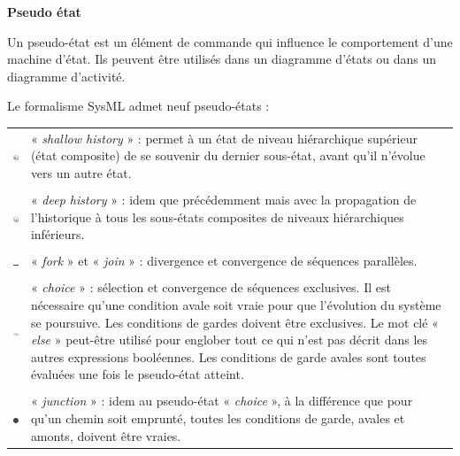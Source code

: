 \documentclass[10pt]{article}
\begin{document}
\begin{defi}
\textbf{Pseudo état}

Un pseudo-état est un élément de commande qui influence le comportement d’une machine d’état. Ils peuvent être utilisés dans un diagramme d’états ou dans un diagramme d’activité.

Le formalisme SysML admet neuf pseudo-états :

\begin{tabular}[c]{c p{15cm}}
\includegraphics[width=.5cm]{images/sh}
&
« \textit{shallow history} » : permet à un état de niveau hiérarchique supérieur (état
composite) de se souvenir du dernier sous-état, avant qu’il n’évolue vers un autre état. \\
& \\
\includegraphics[width=.5cm]{images/dh}
&
« \textit{deep history} » : idem que précédemment mais avec la propagation de l’historique à
tous les sous-états composites de niveaux hiérarchiques inférieurs. \\
& \\
\includegraphics[width=.5cm]{images/fork}
&
« \textit{fork} » et « \textit{join} » : divergence et convergence de séquences parallèles. \\
& \\
\includegraphics[width=.5cm]{images/choice}
&
« \textit{choice} » : sélection et convergence de séquences exclusives. Il est nécessaire
qu’une condition avale soit vraie pour que l’évolution du système se poursuive. Les
conditions de gardes doivent être exclusives. Le mot clé « \textit{else} » peut-être utilisé pour
englober tout ce qui n’est pas décrit dans les autres expressions booléennes. Les
conditions de garde avales sont toutes évaluées une fois le pseudo-état atteint. \\
& \\
\includegraphics[width=.5cm]{images/junction}
&
« \textit{junction} » : idem au pseudo-état « \textit{choice} », à la différence que pour qu’un chemin soit emprunté, toutes les conditions de garde, avales et amonts, doivent être vraies.

\end{tabular}
\end{defi}
\end{document}
